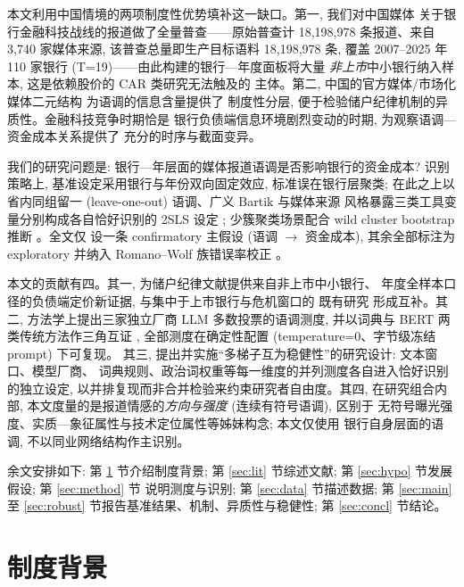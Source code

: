 本文利用中国情境的两项制度性优势填补这一缺口。第一, 我们对中国媒体
关于银行金融科技战线的报道做了全量普查——原始普查计 18{,}198{,}978
条报道、来自 3{,}740 家媒体来源, 该普查总量即生产目标语料 18{,}198{,}978
条, 覆盖 2007--2025 年 110 家银行 (T=19)——由此构建的银行—年度面板将大量
\emph{非上市}中小银行纳入样本, 这是依赖股价的 CAR 类研究无法触及的
主体。第二, 中国的官方媒体/市场化媒体二元结构
\parencite{qin2018mediabias, you2018pen} 为语调的信息含量提供了
制度性分层, 便于检验储户纪律机制的异质性。金融科技竞争时期恰是
银行负债端信息环境剧烈变动的时期, 为观察语调—资金成本关系提供了
充分的时序与截面变异。

我们的研究问题是: 银行—年层面的媒体报道语调是否影响银行的资金成本?
识别策略上, 基准设定采用银行与年份双向固定效应, 标准误在银行层聚类;
在此之上以省内同组留一 (leave-one-out) 语调、广义 Bartik 与媒体来源
风格暴露三类工具变量分别构成各自恰好识别的 2SLS 设定
\parencite{goldsmith2020bartik, wang2024wildiv}; 少簇聚类场景配合
wild cluster bootstrap 推断 \parencite{mackinnon2017wild}。全文仅
设一条 confirmatory 主假设 (语调 $\to$ 资金成本), 其余全部标注为
exploratory 并纳入 Romano--Wolf 族错误率校正
\parencite{romanowolf2005stepwise}。

本文的贡献有四。其一, 为储户纪律文献提供来自非上市中小银行、
年度全样本口径的负债端定价新证据, 与集中于上市银行与危机窗口的
既有研究 \parencite{cookson2026runcatalyst, fang2024mediadeposit,
marchetti2025tone} 形成互补。其二, 方法学上提出三家独立厂商 LLM
多数投票的语调测度, 并以词典与 BERT 两类传统方法作三角互证
\parencite{gilardi2023chatgpt, huang2023finbert, loughran2011liability},
全部测度在确定性配置 (temperature=0、字节级冻结 prompt) 下可复现。
其三, 提出并实施``多梯子互为稳健性''的研究设计: 文本窗口、模型厂商、
词典规则、政治词权重等每一维度的并列测度各自进入恰好识别的独立设定,
以并排复现而非合并检验来约束研究者自由度。其四, 在研究组合内部,
本文度量的是报道情感的\emph{方向与强度} (连续有符号语调), 区别于
无符号曝光强度、实质—象征属性与技术定位属性等姊妹构念; 本文仅使用
银行自身层面的语调, 不以同业网络结构作主识别。

余文安排如下: 第 \ref{sec:inst} 节介绍制度背景; 第 \ref{sec:lit}
节综述文献; 第 \ref{sec:hypo} 节发展假设; 第 \ref{sec:method} 节
说明测度与识别; 第 \ref{sec:data} 节描述数据; 第 \ref{sec:main}
至 \ref{sec:robust} 节报告基准结果、机制、异质性与稳健性;
第 \ref{sec:concl} 节结论。

\section{制度背景}\label{sec:inst}

